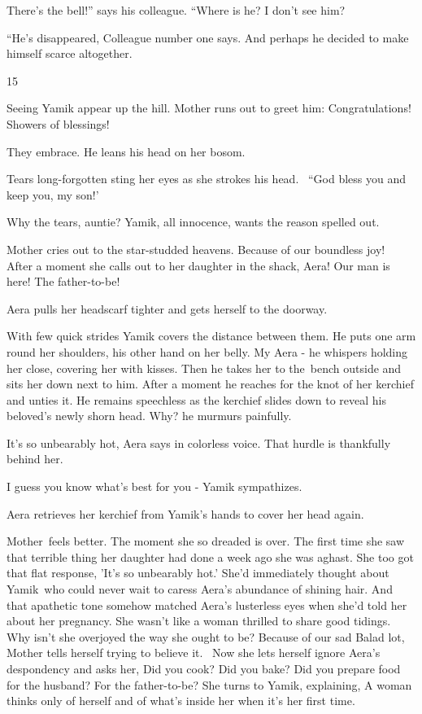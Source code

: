 \documentclass[letterpaper]{article}
\begin{document}
{\textquotedbl}There's the bell!'' says his colleague. ``Where is he? I don't see him?{\textquotedbl} 

{}``He's disappeared,{\textquotedbl} Colleague number one says. {\textquotedbl}And perhaps he decided to make himself
scarce altogether.{\textquotedbl}


\bigskip

15~~

Seeing Yamik appear up the hill. Mother runs out to greet him: {\textquotedbl}Congratulations! Showers of
blessings!{\textquotedbl} \ 

They embrace. He leans his head on her bosom.

Tears long-forgotten sting her eyes as she strokes his head. \ {}``God bless you and keep you, my son!' 

{\textquotedbl}Why the tears, auntie?{\textquotedbl} Yamik, all innocence, wants the reason spelled out. 

Mother cries out to the star-studded heavens. {\textquotedbl}Because of our boundless joy!{\textquotedbl}~ After a
moment she calls out to her daughter in the shack, {\textquotedbl}Aera! Our man is here! The
father-to-be!{\textquotedbl}

Aera pulls her headscarf tighter and gets herself to the doorway.

With few quick strides Yamik covers the distance between them. He puts one arm round her shoulders, his other hand on
her belly. {\textquotedbl}My Aera -{\textquotedbl} he whispers holding her close, covering her with kisses. Then he
takes her to the~bench outside and sits her down next to him. After a moment he reaches for the knot of her kerchief
and unties it. He remains speechless as the kerchief slides down to reveal his beloved{}'s newly shorn head.
{\textquotedbl}Why?{\textquotedbl} he murmurs painfully. 

{\textquotedbl}It's so unbearably hot,{\textquotedbl} Aera says in colorless voice. That hurdle is thankfully behind
her. 

{\textquotedbl}I guess you know what's best for you -{\textquotedbl} Yamik sympathizes. 

Aera retrieves her kerchief from Yamik's hands to cover her head again.\ 

Mother~feels better. The moment she so dreaded is over. The first time she saw that terrible thing her daughter had done
a week ago she was aghast. She too got that flat response, 'It's so unbearably hot.' She'd immediately thought about
Yamik~who could never wait to caress Aera's abundance of shining hair. And that apathetic tone somehow matched Aera's
lusterless eyes when she'd told her about her pregnancy. She wasn't like a woman thrilled to share good tidings. Why
isn't she overjoyed the way she ought to be? Because of our sad Balad lot, Mother tells herself trying to believe it.
\ Now she lets herself ignore Aera's despondency and asks her, {\textquotedbl}Did you cook? Did you bake? Did you
prepare food for the husband? For the father-to-be?{\textquotedbl} She turns to Yamik, explaining, {\textquotedbl}A
woman thinks only of herself and of what's inside her when it's her first time.{\textquotedbl}
\end{document}
